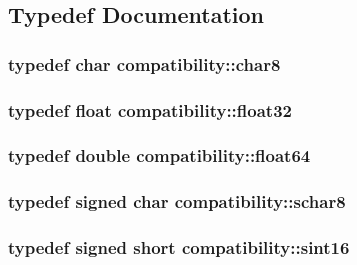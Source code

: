 \subsection{Typedef Documentation}
\hypertarget{namespacecompatibility_a451d9cfd3da606a663aa298356f0b5a5}{
\subsubsection[{char8}]{\setlength{\rightskip}{0pt plus 5cm}typedef char {\bf compatibility::char8}}}
\label{namespacecompatibility_a451d9cfd3da606a663aa298356f0b5a5}
\hypertarget{namespacecompatibility_a32a2d006ac2172c0f859370287f0104c}{
\subsubsection[{float32}]{\setlength{\rightskip}{0pt plus 5cm}typedef float {\bf compatibility::float32}}}
\label{namespacecompatibility_a32a2d006ac2172c0f859370287f0104c}
\hypertarget{namespacecompatibility_ad1034b2c5db68564c02da8d500b21038}{
\subsubsection[{float64}]{\setlength{\rightskip}{0pt plus 5cm}typedef double {\bf compatibility::float64}}}
\label{namespacecompatibility_ad1034b2c5db68564c02da8d500b21038}
\hypertarget{namespacecompatibility_a97718d4c4d671d147c6367c4aa8eaaaf}{
\subsubsection[{schar8}]{\setlength{\rightskip}{0pt plus 5cm}typedef signed char {\bf compatibility::schar8}}}
\label{namespacecompatibility_a97718d4c4d671d147c6367c4aa8eaaaf}
\hypertarget{namespacecompatibility_a55f18a31bf0e1572da9efb10a7b475fc}{
\subsubsection[{sint16}]{\setlength{\rightskip}{0pt plus 5cm}typedef signed short {\bf compatibility::sint16}}}
